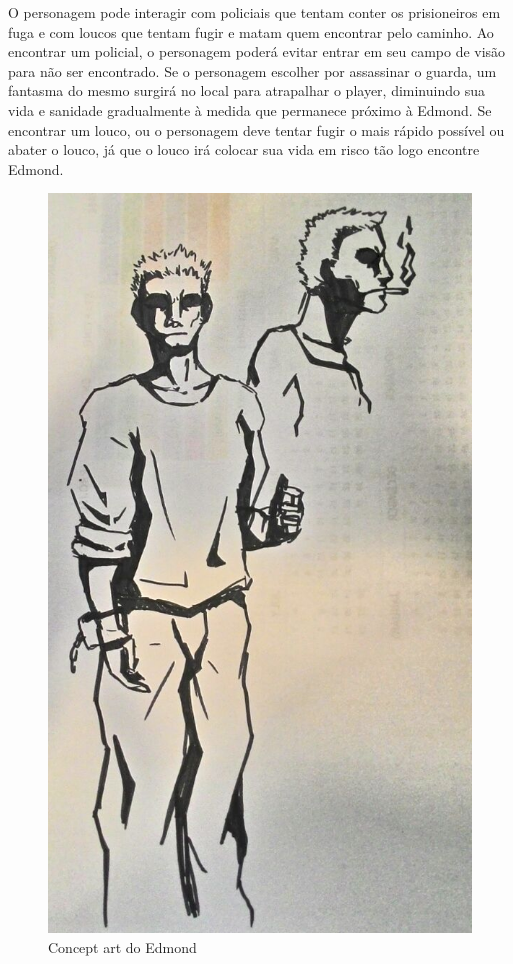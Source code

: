 \documentclass{article}
\begin{document}
O personagem pode interagir com policiais que tentam conter os prisioneiros em fuga e com loucos que tentam fugir e matam quem encontrar pelo caminho. Ao encontrar um policial, o personagem poderá evitar entrar em seu campo de visão para não ser encontrado. Se o personagem escolher por assassinar o guarda, um fantasma do mesmo surgirá no local para atrapalhar o player, diminuindo sua vida e sanidade gradualmente à medida que permanece próximo à Edmond. Se encontrar um louco, ou o personagem deve tentar fugir o mais rápido possível ou abater o louco, já que o louco irá colocar sua vida em risco tão logo encontre Edmond.

\begin{figure}[h]
    \centering
    \caption{Concept art do Edmond}
     \includegraphics[keepaspectratio=true,scale=0.30]{images/Prev_Ed.png}
\end{figure}
\end{document}
